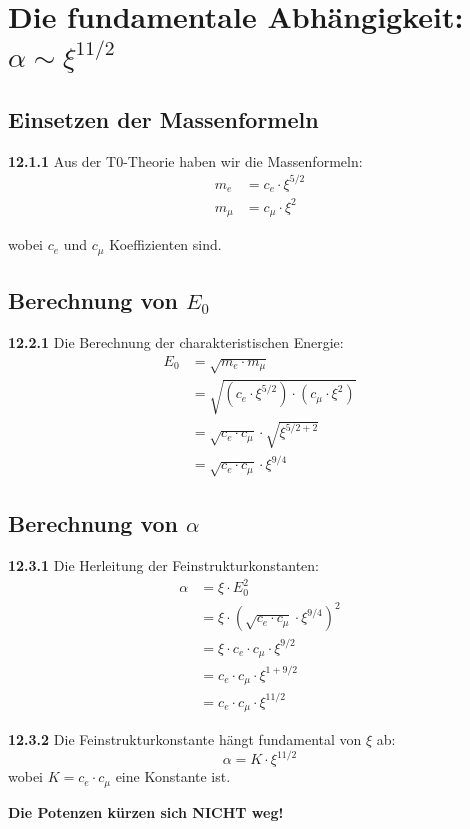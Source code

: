 \section{Die fundamentale Abhängigkeit: $\alpha \sim \xi^{11/2}$}

\subsection{Einsetzen der Massenformeln}

\noindent \textbf{12.1.1} Aus der T0-Theorie haben wir die Massenformeln:
\begin{align}
	m_e &= c_e \cdot \xi^{5/2} \\
	m_\mu &= c_\mu \cdot \xi^2
\end{align}

wobei $c_e$ und $c_\mu$ Koeffizienten sind.

\subsection{Berechnung von $E_0$}

\noindent \textbf{12.2.1} Die Berechnung der charakteristischen Energie:
\begin{align}
	E_0 &= \sqrt{m_e \cdot m_\mu} \\
	&= \sqrt{(c_e \cdot \xi^{5/2}) \cdot (c_\mu \cdot \xi^2)} \\
	&= \sqrt{c_e \cdot c_\mu} \cdot \sqrt{\xi^{5/2 + 2}} \\
	&= \sqrt{c_e \cdot c_\mu} \cdot \xi^{9/4}
\end{align}

\subsection{Berechnung von $\alpha$}

\noindent \textbf{12.3.1} Die Herleitung der Feinstrukturkonstanten:
\begin{align}
	\alpha &= \xi \cdot E_0^2 \\
	&= \xi \cdot (\sqrt{c_e \cdot c_\mu} \cdot \xi^{9/4})^2 \\
	&= \xi \cdot c_e \cdot c_\mu \cdot \xi^{9/2} \\
	&= c_e \cdot c_\mu \cdot \xi^{1 + 9/2} \\
	&= c_e \cdot c_\mu \cdot \xi^{11/2}
\end{align}

\begin{tcolorbox}[colback=red!5!white,colframe=red!75!black,title=\textbf{WICHTIGES ERGEBNIS}]
	\noindent \textbf{12.3.2} Die Feinstrukturkonstante hängt fundamental von $\xi$ ab:
	\begin{equation}
		\boxed{\alpha = K \cdot \xi^{11/2}}
	\end{equation}
	wobei $K = c_e \cdot c_\mu$ eine Konstante ist.
	
	\textbf{Die Potenzen kürzen sich NICHT weg!}
\end{tcolorbox}

